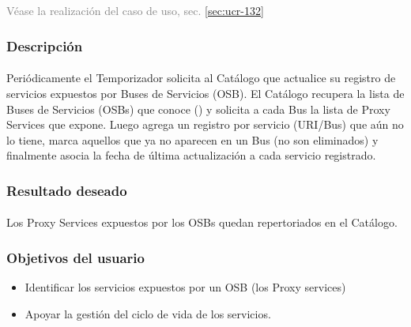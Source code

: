 \subsection{\ucCXxxiiFullName{}}\label{uc-132}
\textcolor{gray}{V\'ease la realizaci\'on del caso de uso, sec. \ref{sec:ucr-132}}

\subsubsection*{Descripci\'on}
\paragraph{}
Peri\'odicamente el Temporizador solicita al Cat\'alogo
que actualice su registro de servicios expuestos por Buses de Servicios (OSB).
%
El Cat\'alogo recupera la lista de Buses de Servicios (OSBs) que conoce
() y
solicita a cada Bus la lista de Proxy Services que expone.
%
Luego agrega un registro por servicio (URI/Bus) que a\'un no lo tiene,
marca aquellos que ya no aparecen en un Bus (no son eliminados) y
finalmente asocia la fecha de \'ultima actualizaci\'on a cada servicio registrado.


\subsubsection*{Resultado deseado}
\paragraph{}
Los Proxy Services expuestos por los OSBs quedan repertoriados en el Cat\'alogo.


\subsubsection*{Objetivos del usuario}
\begin{itemize}
    \item Identificar los servicios expuestos por un OSB (los Proxy services)
    \item Apoyar la gesti\'on del ciclo de vida de los servicios.
\end{itemize}



